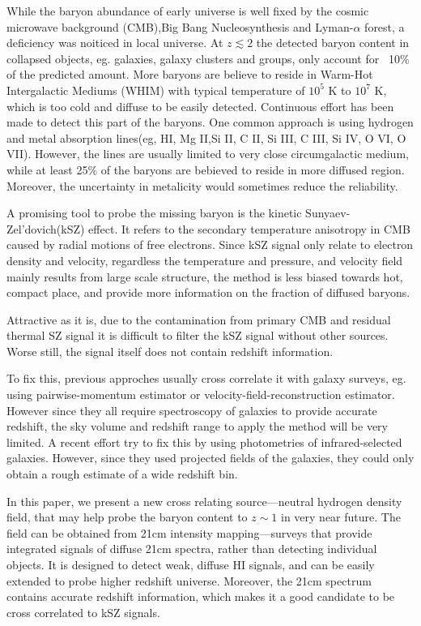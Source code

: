 While the baryon abundance of early universe is well fixed by the cosmic microwave background (CMB),Big Bang Nucleosynthesis and Lyman-$\alpha$ forest\cite{Cook14}\cite{Fukugita98}\cite{Komatsu11}\cite{Hinshaw13}, 
a deficiency was noiticed in local universe.
At $z\lesssim 2$ the detected baryon content in collapsed
objects, eg. galaxies, galaxy clusters and groups, only account for ~10$\%$ of the predicted amount.
More baryons are believe to reside in Warm-Hot Intergalactic Mediums (WHIM) with typical temperature of $10^5$ K to $10^7$ K\cite{Soltan06}, which is too cold and diffuse to be easily detected.
Continuous effort has been made to detect this part of the baryons. 
One common approach is using hydrogen and metal absorption lines(eg, HI, Mg II,Si II, C II, Si III, C III, Si IV, O VI, O VII).\cite{Salucci99}\cite{Werk}
However, the lines are usually limited to very close circumgalactic medium, while at least 25\% of the baryons are bebieved to reside in more diffused region\cite{Dave2010}. Moreover, the uncertainty in metalicity would sometimes reduce the reliability.

A promising tool to probe the missing baryon is the kinetic Sunyaev-Zel'dovich(kSZ) effect\cite{Sunyae72}\cite{Sunyaev80}. 
It refers to the secondary temperature anisotropy in CMB caused by radial motions of free electrons.
Since kSZ signal only relate to electron density and velocity, 
regardless the temperature and pressure, 
and velocity field mainly results from large scale structure, 
the method is less biased towards hot, compact place, 
and provide more information on the fraction of diffused baryons.

Attractive as it is, 
due to the contamination from primary CMB and residual thermal SZ signal
it is difficult to filter the kSZ signal without other sources. 
Worse still, the signal itself does not contain redshift information.

To fix this, previous approches usually cross correlate it with galaxy surveys, 
eg. using pairwise-momentum estimator\cite{Hand2012} or velocity-field-reconstruction estimator\cite{Shao2011}\cite{Li2014}. 
However since they all require spectroscopy of galaxies to provide accurate redshift, the sky volume and redshift range to apply the method will be very limited. 
A recent effort try to fix this by using photometries of infrared-selected galaxies. 
However, since they used projected fields of the galaxies, they could only obtain a rough estimate of a wide redshift bin\cite{Hill2016}.

In this paper, we present a new cross relating source---neutral hydrogen density field, 
that may help probe the baryon content to $z\sim1$ in very near future.
The field can be obtained from 21cm intensity mapping---surveys that provide integrated signals of diffuse 21cm spectra, 
rather than detecting individual objects. 
It is designed to detect weak, diffuse HI signals, and can be easily extended to probe higher redshift universe.
Moreover, the 21cm spectrum contains accurate redshift information, which makes it a good candidate to be cross correlated to kSZ signals.

